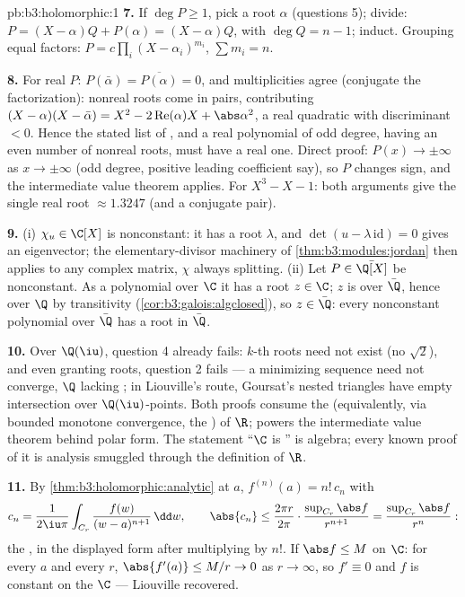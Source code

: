 \begin{solution}{pb:b3:holomorphic:1}
\textbf{7.} If $\deg P \geq 1$, pick a root $\alpha$
(questions 5); divide: $P = (X - \alpha)Q + P(\alpha) = (X -
\alpha)Q$, with $\deg Q = n - 1$; induct. Grouping equal
factors: $P = c\prod_i(X - \alpha_i)^{m_i}$, $\sum m_i = n$.

\textbf{8.} For real $P$: $P(\bar\alpha) =
\overline{P(\alpha)} = 0$, and multiplicities agree
(conjugate the factorization): nonreal roots come in pairs,
contributing $(X - \alpha)(X - \bar\alpha) = X^2 -
2\operatorname{Re}(\alpha)X + \abs\alpha^2$, a real quadratic
with discriminant $< 0$. Hence the stated list of
, and a real polynomial of odd degree, having an
even number of nonreal roots, must have a real one. Direct
proof: $P(x) \to \pm\infty$ as $x \to \pm\infty$ (odd degree,
positive leading coefficient say), so $P$ changes sign, and
the intermediate value theorem applies. For $X^3 - X - 1$:
both arguments give the single real root $\approx 1.3247$
(and a conjugate pair).

\textbf{9.} (i) $\chi_u \in \C[X]$ is nonconstant: it has a
root $\lambda$, and $\det(u - \lambda\,\mathrm{id}) = 0$
gives an eigenvector; the elementary-divisor machinery of
\cref{thm:b3:modules:jordan} then applies to any complex
matrix, $\chi$ always splitting. (ii) Let $P \in \bar\Q[X]$
be nonconstant. As a polynomial over $\C$ it has a root $z
\in \C$; $z$ is  over $\bar\Q$, hence over $\Q$ by
transitivity (\cref{cor:b3:galois:algclosed}), so $z \in
\bar\Q$: every nonconstant polynomial over $\bar\Q$ has a
root in $\bar\Q$.

\textbf{10.} Over $\Q(\iu)$, question 4 already fails:
$k$-th roots need not exist (no $\sqrt2$), and even granting
roots, question 2 fails --- a minimizing sequence need not
converge, $\Q$ lacking ; in Liouville's route,
Goursat's nested  triangles have empty intersection
over $\Q(\iu)$-points. Both proofs consume the 
(equivalently, via bounded monotone convergence, the
) of $\R$;  powers the
intermediate value theorem behind polar form. The statement
``$\C$ is '' is algebra; every known
proof of it is analysis smuggled through the definition of
$\R$.

\textbf{11.} By \cref{thm:b3:holomorphic:analytic} at $a$,
$f^{(n)}(a) = n!\,c_n$ with
\[
c_n = \frac1{2\iu\pi}\int_{C_r}\frac{f(w)}{(w -
a)^{n+1}}\,\dd w,
\qquad
\abs{c_n} \leq \frac{2\pi r}{2\pi}\cdot
\frac{\sup_{C_r}\abs f}{r^{n+1}}
= \frac{\sup_{C_r}\abs f}{r^{n}} :
\]
the , in the displayed form after
multiplying by $n!$. If $\abs f \leq M$ on $\C$: for every
$a$ and every $r$, $\abs{f'(a)} \leq M/r \to 0$ as $r \to
\infty$, so $f' \equiv 0$ and $f$ is constant on the
 $\C$ --- Liouville recovered.


\end{solution}
